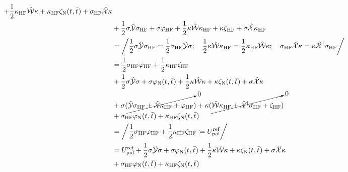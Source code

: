 \begin{equation}
\begin{aligned}
  + \frac{1}{2}\kappa_\mathrm{HF}\hat{\mathcal{W}}\kappa
  + \kappa_\mathrm{HF}\zeta_{\mathrm{N}}(t_{},\bar{t}_{})
  + \sigma_\mathrm{HF}\hat{\mathcal{X}}\kappa \\
&+  \frac{1}{2}\sigma\hat{\mathcal{Y}}\sigma_\mathrm{HF}
  + \sigma\varphi_\mathrm{HF}
  + \frac{1}{2}\kappa\hat{\mathcal{W}}\kappa_\mathrm{HF}
  + \kappa\zeta_\mathrm{HF}
  + \sigma\hat{\mathcal{X}}\kappa_\mathrm{HF} \\
&= \left/
  \frac{1}{2}\sigma\hat{\mathcal{Y}}\sigma_\mathrm{HF}
  =
  \frac{1}{2}\sigma_\mathrm{HF}\hat{\mathcal{Y}}\sigma;\quad
  \frac{1}{2}\kappa\hat{\mathcal{W}}\kappa_\mathrm{HF}
  =
  \frac{1}{2}\kappa_\mathrm{HF}\hat{\mathcal{W}}\kappa; \quad
  \sigma_\mathrm{HF}\hat{\mathcal{X}}\kappa
  =
  \kappa\hat{\mathcal{X}}^\dagger\sigma_\mathrm{HF}
  \right/ \\
&=
    \frac{1}{2}\sigma_\mathrm{HF}\varphi_\mathrm{HF}
  + \frac{1}{2}\kappa_\mathrm{HF}\zeta_\mathrm{HF} \\
&+  \frac{1}{2}\sigma\hat{\mathcal{Y}}\sigma
  + \sigma\varphi_{\mathrm{N}}(t_{},\bar{t}_{})
  + \frac{1}{2}\kappa\hat{\mathcal{W}}\kappa
  + \kappa\zeta_{\mathrm{N}}(t_{},\bar{t}_{})
  + \sigma\hat{\mathcal{X}}\kappa \\
  &+ \sigma(\cancelto{0}{\hat{\mathcal{Y}}\sigma_\mathrm{HF} + \hat{\mathcal{X}}\kappa_\mathrm{HF} + \varphi_\mathrm{HF}})
  + \kappa(\cancelto{0}{\hat{\mathcal{W}}\kappa_\mathrm{HF} + \hat{\mathcal{X}}^\dagger\sigma_\mathrm{HF} + \zeta_\mathrm{HF}}) \\
&+ \sigma_\mathrm{HF}\varphi_{\mathrm{N}}(t_{},\bar{t}_{}) + \kappa_\mathrm{HF}\zeta_{\mathrm{N}}(t_{},\bar{t}_{}) \\
&= \left/
    \frac{1}{2}\sigma_\mathrm{HF}\varphi_\mathrm{HF}
  + \frac{1}{2}\kappa_\mathrm{HF}\zeta_\mathrm{HF}
  \coloneq U_\mathrm{pol}^\mathrm{ref}
  \right/ \\
&=
  U_\mathrm{pol}^\mathrm{ref}
  +  \frac{1}{2}\sigma\hat{\mathcal{Y}}\sigma
  + \sigma\varphi_{\mathrm{N}}(t_{},\bar{t}_{})
  + \frac{1}{2}\kappa\hat{\mathcal{W}}\kappa
  + \kappa\zeta_{\mathrm{N}}(t_{},\bar{t}_{})
  + \sigma\hat{\mathcal{X}}\kappa \\
&+ \sigma_\mathrm{HF}\varphi_{\mathrm{N}}(t_{},\bar{t}_{}) + \kappa_\mathrm{HF}\zeta_{\mathrm{N}}(t_{},\bar{t}_{})
  \end{aligned}
\end{equation}

